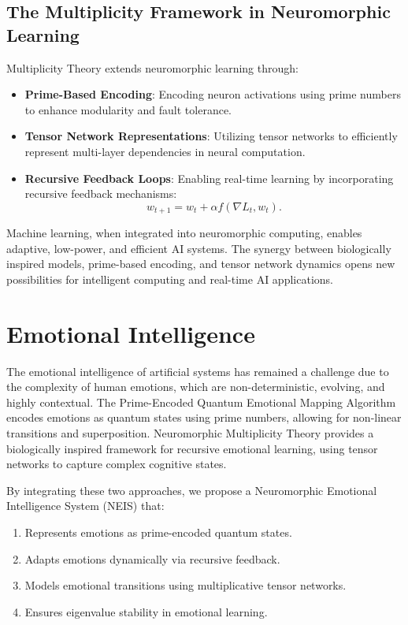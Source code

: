 \documentclass{article}
\theoremstyle{plain}
\begin{document}
\begin{itemize}
\begin{itemize}
\subsection{The Multiplicity Framework in Neuromorphic Learning}
Multiplicity Theory extends neuromorphic learning through:
\begin{itemize}
    \item \textbf{Prime-Based Encoding}: Encoding neuron activations using prime numbers to enhance modularity and fault tolerance.
    \item \textbf{Tensor Network Representations}: Utilizing tensor networks to efficiently represent multi-layer dependencies in neural computation.
    \item \textbf{Recursive Feedback Loops}: Enabling real-time learning by incorporating recursive feedback mechanisms:
    \begin{equation}
        w_{t+1} = w_t + \alpha f(\nabla L_t, w_t).
    \end{equation}
\end{itemize}

Machine learning, when integrated into neuromorphic computing, enables adaptive, low-power, and efficient AI systems. The synergy between biologically inspired models, prime-based encoding, and tensor network dynamics opens new possibilities for intelligent computing and real-time AI applications.

\section{Emotional Intelligence}
The emotional intelligence of artificial systems has remained a challenge due to the complexity of human emotions, which are non-deterministic, evolving, and highly contextual. The Prime-Encoded Quantum Emotional Mapping Algorithm encodes emotions as quantum states using prime numbers, allowing for non-linear transitions and superposition. Neuromorphic Multiplicity Theory provides a biologically inspired framework for recursive emotional learning, using tensor networks to capture complex cognitive states.

By integrating these two approaches, we propose a Neuromorphic Emotional Intelligence System (NEIS) that:
\begin{enumerate}
    \item Represents emotions as prime-encoded quantum states.
    \item Adapts emotions dynamically via recursive feedback.
    \item Models emotional transitions using multiplicative tensor networks.
    \item Ensures eigenvalue stability in emotional learning.
\end{enumerate}


\end{itemize}
\end{itemize}
\end{document}
